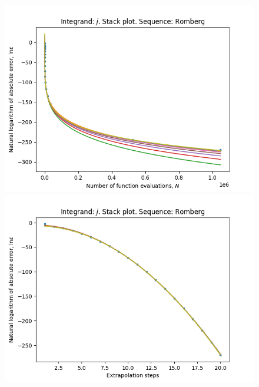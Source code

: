 \begin{figure}[H]
\centering
\begin{minipage}{0.45\textwidth}
\centering
\includegraphics[scale=0.45]{../results/romberg_plots/gaussian_hp_romberg_stack.png}
\end{minipage}
\begin{minipage}{0.45\textwidth}
\centering
\includegraphics[scale=0.45]{../results/romberg_plots/gaussian_hp_romberg_steps_stack.png}
\end{minipage}
\end{figure}

